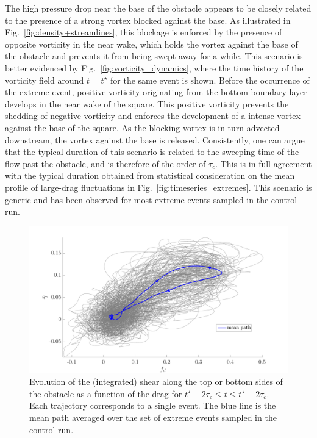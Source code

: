 \documentclass{jfm}
\begin{document}
The high pressure drop near the base of the obstacle appears to be closely related to the presence of a strong vortex blocked against the base. 
As illustrated in Fig.~\ref{fig:density+streamlines}, this blockage is enforced by the presence of opposite vorticity in the near wake, which holds the vortex against the base of the obstacle and prevents it from being swept away for a while.
% 
This scenario is better evidenced by Fig.~\ref{fig:vorticity_dynamics}, where the time history of the vorticity field around $t=t^\star$ for the same event is shown. 
%
Before the occurrence of the extreme event, positive vorticity originating from the bottom boundary layer develops in the near wake of the square. This positive vorticity  prevents the shedding of negative vorticity and enforces the development of a intense vortex against the base of the square. 
As the blocking vortex is in turn advected downstream, the vortex against the base is released.
%
Consistently, one can argue that the typical duration of this scenario is related to the sweeping time of the flow past the obstacle, and is therefore of the order of $\tau_c$.
This is in full agreement with the typical duration obtained from statistical consideration on the mean profile of large-drag fluctuations in Fig.~\ref{fig:timeseries_extremes}.
This scenario is generic and has been observed for most extreme events sampled in the control run.


\begin{figure}
	\centering
	\includegraphics[width=.7\linewidth]{shear_asof_drag/shear_asof_drag}
	\caption{\label{fig:shear_asof_drag} Evolution of the (integrated) shear along the top or bottom sides of the obstacle as a function of the drag for $t^{\star}-2\tau_c \leq t \leq t^{\star}-2\tau_c$. Each trajectory corresponds to a single event. The blue line is the mean path averaged over the set of extreme events sampled in the control run.}
\end{figure}
\end{document}

